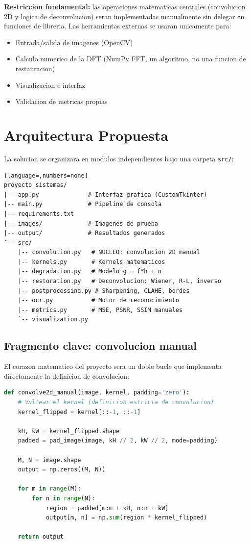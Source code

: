 \documentclass[11pt,a4paper]{article}
\begin{document}
\textbf{Restriccion fundamental:} las operaciones matematicas centrales (convolucion 2D y logica de deconvolucion) seran implementadas manualmente sin delegar en funciones de libreria. Las herramientas externas se usaran unicamente para:
\begin{itemize}[leftmargin=*, noitemsep]
    \item Entrada/salida de imagenes (OpenCV)
    \item Calculo numerico de la DFT (NumPy FFT, un algoritmo, no una funcion de restauracion)
    \item Visualizacion e interfaz
    \item Validacion de metricas propias
\end{itemize}

\section{Arquitectura Propuesta}

La solucion se organizara en modulos independientes bajo una carpeta \texttt{src/}:

\begin{lstlisting}[language=,numbers=none]
proyecto_sistemas/
|-- app.py              # Interfaz grafica (CustomTkinter)
|-- main.py             # Pipeline de consola
|-- requirements.txt
|-- images/             # Imagenes de prueba
|-- output/             # Resultados generados
`-- src/
    |-- convolution.py   # NUCLEO: convolucion 2D manual
    |-- kernels.py       # Kernels matematicos
    |-- degradation.py   # Modelo g = f*h + n
    |-- restoration.py   # Deconvolucion: Wiener, R-L, inverso
    |-- postprocessing.py # Sharpening, CLAHE, bordes
    |-- ocr.py           # Motor de reconocimiento
    |-- metrics.py       # MSE, PSNR, SSIM manuales
    `-- visualization.py
\end{lstlisting}

\subsection{Fragmento clave: convolucion manual}

El corazon matematico del proyecto sera un doble bucle que implementa directamente la definicion de convolucion:

\begin{lstlisting}[language=Python]
def convolve2d_manual(image, kernel, padding='zero'):
    # Voltear el kernel (definicion estricta de convolucion)
    kernel_flipped = kernel[::-1, ::-1]

    kH, kW = kernel_flipped.shape
    padded = pad_image(image, kH // 2, kW // 2, mode=padding)

    M, N = image.shape
    output = np.zeros((M, N))

    for m in range(M):
        for n in range(N):
            region = padded[m:m + kH, n:n + kW]
            output[m, n] = np.sum(region * kernel_flipped)

    return output
\end{lstlisting}
\end{document}
